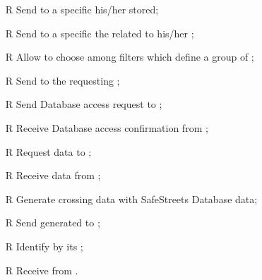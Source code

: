 \documentclass[../../../rasd.tex]{subfiles}
\begin{document}
\begin{itemize}
	\item[R\subs{21}]Send to a specific  his/her  stored;
	\item[R\subs{22}]Send to a specific  the  related to his/her ;
	\item[R\subs{23}]Allow  to choose among filters which define a group of ;
	\item[R\subs{24}]Send  to the requesting ;
	\item[R\subs{25}]Send  Database access request to ; 
	\item[R\subs{26}]Receive  Database access confirmation from ;
	\item[R\subs{27}]Request  data to ;
	\item[R\subs{28}]Receive  data from ;
	\item[R\subs{29}]Generate  crossing   data with SafeStreets Database data;
	\item[R\subs{30}]Send generated  to ;
	\item[R\subs{31}]Identify  by its ;
	\item[R\subs{32}]Receive  from .

	
\end{itemize}
\end{document}
